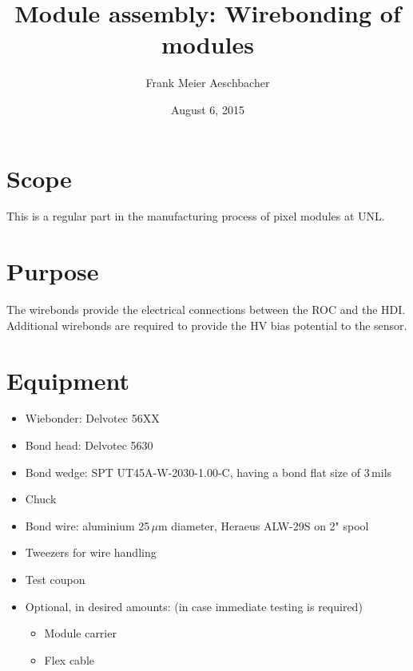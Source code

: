 \documentclass[12pt]{unlsilabsop}
\title{Module assembly: Wirebonding of modules}
\date{August 6, 2015}
\author{Frank Meier Aeschbacher}
\begin{document}
\maketitle

\section{Scope}
This is a regular part in the manufacturing process of pixel modules at UNL.

\section{Purpose}
The wirebonds provide the electrical connections between the ROC and the HDI. Additional wirebonds are required to provide the HV bias potential to the sensor.



\section{Equipment}

\begin{itemize}
    \item Wiebonder: Delvotec 56XX
    \item Bond head: Delvotec 5630
    \item Bond wedge: SPT UT45A-W-2030-1.00-C, having a bond flat size of 3\,mils
    \item Chuck
    \item Bond wire: aluminium 25\,$\mu$m diameter, Heraeus ALW-29S on 2" spool
    \item Tweezers for wire handling
    \item Test coupon
    \item Optional, in desired amounts: (in case immediate testing is required)
    \begin{itemize}
	\item Module carrier
	\item Flex cable
    \end{itemize}
\end{itemize}
\end{document}
